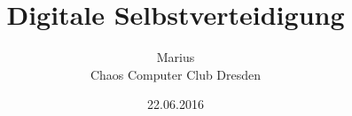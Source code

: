 \title{Digitale Selbstverteidigung}
\author{\small Marius \\\large Chaos Computer Club Dresden}
\date{22.06.2016}
